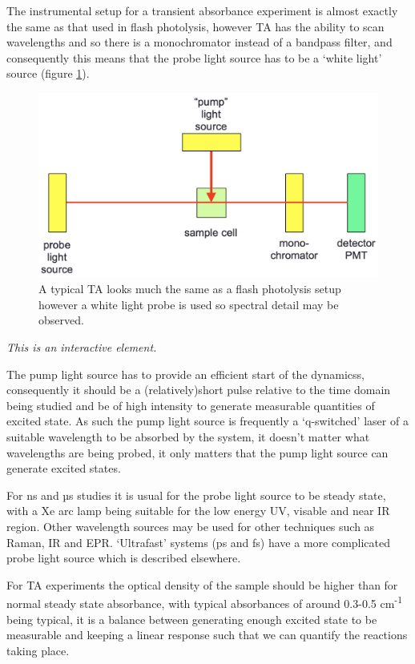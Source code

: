 \documentclass[
]{book}
\begin{document}
The instrumental setup for a transient absorbance experiment is almost exactly the same as that used in flash photolysis, however TA has the ability to scan wavelengths and so there is a monochromator instead of a bandpass filter, and consequently this means that the probe light source has to be a `white light' source (figure \ref{fig:TAsetup}).

\begin{figure}

{\centering \includegraphics[width=0.6\linewidth]{images/TAsetup} 

}

\caption{A typical TA looks much the same as a flash photolysis setup however a white light probe is used so spectral detail may be observed.}\label{fig:TAsetup}
\end{figure}

\emph{This is an interactive element.}

The pump light source has to provide an efficient start of the dynamicss, consequently it should be a (relatively)short pulse relative to the time domain being studied and be of high intensity to generate measurable quantities of excited state. As such the pump light source is frequently a `q-switched' laser of a suitable wavelength to be absorbed by the system, it doesn't matter what wavelengths are being probed, it only matters that the pump light source can generate excited states.

For ns and µs studies it is usual for the probe light source to be steady state, with a Xe arc lamp being suitable for the low energy UV, visable and near IR region. Other wavelength sources may be used for other techniques such as Raman, IR and EPR. `Ultrafast' systems (ps and fs) have a more complicated probe light source which is described elsewhere.

For TA experiments the optical density of the sample should be higher than for normal steady state absorbance, with typical absorbances of around 0.3-0.5 cm\textsuperscript{-1} being typical, it is a balance between generating enough excited state to be measurable and keeping a linear response such that we can quantify the reactions taking place.
\end{document}
